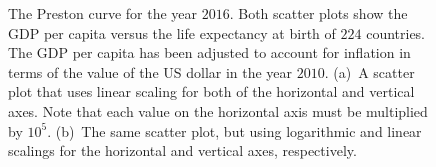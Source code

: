 \documentclass[a4paper,oneside,12pt]{article}
\begin{document}
\begin{problem}
{\begin{solution}
\begin{figure}[!htbp]
\centering
{}
\caption{%
  The Preston curve for the year $2016$.  Both scatter plots show the
  GDP per capita versus the life expectancy at birth of $224$
  countries.  The GDP per capita has been adjusted to account for
  inflation in terms of the value of the US dollar in the year
  $2010$.  (a)~A scatter plot that uses linear scaling for both of the
  horizontal and vertical axes.  Note that each value on the
  horizontal axis must be multiplied by $10^5$.  (b)~The same scatter
  plot, but using logarithmic and linear scalings for the horizontal
  and vertical axes, respectively.
}
\label{fig:logarithm:Preston_curve_2016}
\end{figure}


\end{solution}}
\end{problem}
\end{document}
